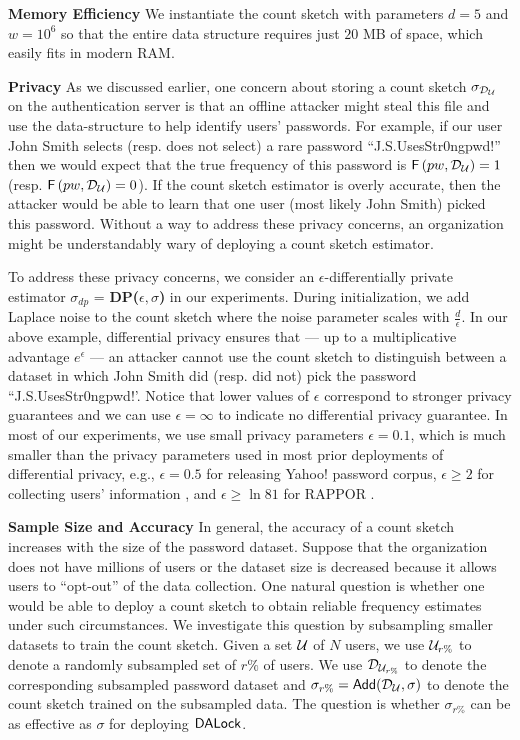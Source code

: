 \textbf{Memory Efficiency} We instantiate the count sketch with parameters $d=5$ and $w=10^6$ so that the entire data structure requires just $20$ MB of space, which easily fits in modern RAM. 



\textbf{Privacy} As we discussed earlier, one concern about storing a count sketch $\sigma_{\mathcal{D}_{{\mathcal{U}}}} $ on the authentication server is that an offline attacker might steal this file and use the data-structure to help identify users' passwords. For example, if our user John Smith selects (resp. does not select) a rare password ``J.S.UsesStr0ngpwd!'' then we would expect that the true frequency of this password is $\mathsf{F}\left(pw, \mathcal{D}_{{\mathcal{U}}} \right)=1$ (resp. $\mathsf{F}\left(pw, \mathcal{D}_{{\mathcal{U}}} \right)=0$). If the count sketch estimator is overly accurate, then the attacker would be able to learn that one user (most likely John Smith) picked this password. Without a way to address these privacy concerns, an organization might be understandably wary of deploying a count sketch estimator.



To address these privacy concerns, we consider an $\epsilon$-differentially private estimator $\sigma_{dp}$ = \textbf{DP($\epsilon,\sigma$)} in our experiments. During initialization, we add Laplace noise to the count sketch where the noise parameter scales with $\frac{d}{\epsilon}$. In our above example, differential privacy ensures that --- up to a multiplicative advantage $e^{\epsilon}$ --- an attacker cannot use the count sketch to distinguish between a dataset in which John Smith did (resp. did not) pick the password ``J.S.UsesStr0ngpwd!'. Notice that lower values of $\epsilon$ correspond to stronger privacy guarantees and we can use $\epsilon=\infty$ to indicate no differential privacy guarantee. In most of our experiments, we use small privacy parameters $\epsilon=0.1$, which is much smaller than the privacy parameters used in most prior deployments of differential privacy, e.g., $\epsilon = 0.5$ for releasing Yahoo! password corpus\cite{NDSS:BloDatBon16}, $\epsilon \ge 2$ for collecting users' information \cite{AppleDPTeam}, and $\epsilon \ge  \ln{81}$ for RAPPOR \cite{CCS:ErlPihKor14,USENIX:WBLJ17}. 



\textbf{Sample Size and Accuracy} In general, the accuracy of a count sketch increases with the size of the password dataset. Suppose that the organization does not have millions of users or the dataset size is decreased because it allows users to ``opt-out” of the data collection. One natural question is whether one would be able to deploy a count sketch to obtain reliable frequency estimates under such circumstances. We investigate this question by subsampling smaller datasets to train the count sketch. Given a set $\mathcal{U}$ of $N$ users, we use $\mathcal{U}_{r\%}$ to denote a randomly subsampled set of $r\%$ of users. We use $\mathcal{D}_{{\mathcal{U}_{r\%}}}$ to denote the corresponding subsampled password dataset and $\sigma_{r\%} = \mathsf{Add}(\mathcal{D}_{{\mathcal{U}}},\sigma) $ to denote the count sketch trained on the subsampled data. The question is whether $\sigma_{r\%}$ can be as effective as $\sigma$ for deploying $\mathsf{DALock}$. 



